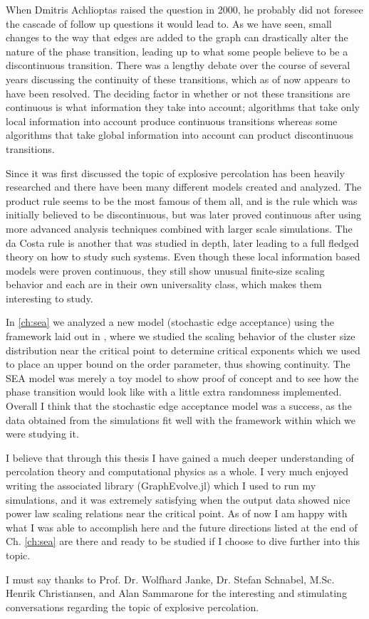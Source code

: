 When Dmitris Achlioptas raised the question in 2000, he probably did not foresee the cascade of follow up questions it would lead to.
As we have seen, small changes to the way that edges are added to the graph can drastically alter the nature of the phase transition, leading up to what some people believe to be a discontinuous transition.
There was a lengthy debate over the course of several years discussing the continuity of these transitions, which as of now appears to have been resolved.
The deciding factor in whether or not these transitions are continuous is what information they take into account; algorithms that take only local information into account produce continuous transitions whereas some algorithms that take global information into account can product discontinuous transitions.

Since it was first discussed the topic of explosive percolation has been heavily researched and there have been many different models created and analyzed.
The product rule seems to be the most famous of them all, and is the rule which was initially believed to be discontinuous, but was later proved continuous after using more advanced analysis techniques combined with larger scale simulations.
The da Costa rule is another that was studied in depth, later leading to a full fledged theory on how to study such systems.
Even though these local information based models were proven continuous, they still show unusual finite-size scaling behavior and each are in their own universality class, which makes them interesting to study.

In \ref{ch:sea} we analyzed a new model (stochastic edge acceptance) using the framework laid out in \cite{Lee_1}, where we studied the scaling behavior of the cluster size distribution near the critical point to determine critical exponents which we used to place an upper bound on the order parameter, thus showing continuity.
The SEA model was merely a toy model to show proof of concept and to see how the phase transition would look like with a little extra randomness implemented.
Overall I think that the stochastic edge acceptance model was a success, as the data obtained from the simulations fit well with the framework within which we were studying it.

I believe that through this thesis I have gained a much deeper understanding of percolation theory and computational physics as a whole.
I very much enjoyed writing the associated library (GraphEvolve.jl) which I used to run my simulations, and it was extremely satisfying when the output data showed nice power law scaling relations near the critical point.
As of now I am happy with what I was able to accomplish here and the future directions listed at the end of Ch. \ref{ch:sea} are there and ready to be studied if I choose to dive further into this topic.

I must say thanks to Prof. Dr. Wolfhard Janke, Dr. Stefan Schnabel, M.Sc. Henrik Christiansen, and Alan Sammarone for the interesting and stimulating conversations regarding the topic of explosive percolation.
